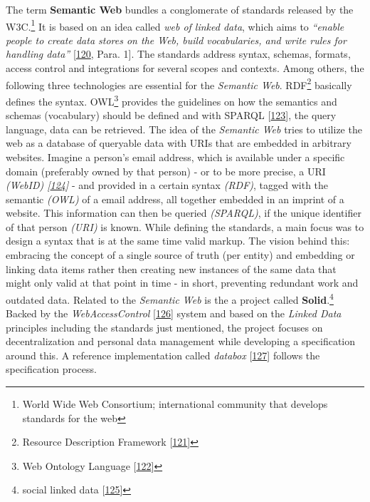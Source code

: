 \documentclass[12pt,english,a4paper,titlepage,cleardoublepage=empty,dottedtoc]{report}
\begin{document}
The term \textbf{\protect\hypertarget{def--semantic-web}{}{Semantic
Web}} bundles a conglomerate of standards released by the W3C.\footnote{World
  Wide Web Consortium; international community that develops standards
  for the web} It is based on an idea called \emph{web of linked data},
which aims to \emph{``enable people to create data stores on the Web,
build vocabularies, and write rules for handling data''}
{[}\protect\hyperlink{ref-web_2016_w3c_semantic-web-activity}{120},
Para. 1{]}. The standards address syntax, schemas, formats, access
control and integrations for several scopes and contexts. Among others,
the following three technologies are essential for the \emph{Semantic
Web}. RDF\footnote{Resource Description Framework
  {[}\protect\hyperlink{ref-web_w3c-tr_rdf}{121}{]}} basically defines
the syntax. OWL\footnote{Web Ontology Language
  {[}\protect\hyperlink{ref-web_w3c-tr_owl}{122}{]}} provides the
guidelines on how the semantics and schemas (vocabulary) should be
defined and with \protect\hypertarget{def--sparql}{}{SPARQL}
{[}\protect\hyperlink{ref-web_w3c-tr_sparql}{123}{]}, the query
language, data can be retrieved. The idea of the \emph{Semantic Web}
tries to utilize the web as a database of queryable data with URIs that
are embedded in arbitrary websites. Imagine a person's email address,
which is available under a specific domain (preferably owned by that
person) - or to be more precise, a URI \emph{(WebID)
{[}\protect\hyperlink{ref-web_w3c-draft_webid}{124}{]}} - and provided
in a certain syntax \emph{(RDF)}, tagged with the semantic \emph{(OWL)}
of a email address, all together embedded in an imprint of a website.
This information can then be queried \emph{(SPARQL)}, if the unique
identifier of that person \emph{(URI)} is known. While defining the
standards, a main focus was to design a syntax that is at the same time
valid markup. The vision behind this: embracing the concept of a single
source of truth (per entity) and embedding or linking data items rather
then creating new instances of the same data that might only valid at
that point in time - in short, preventing redundant work and outdated
data. Related to the \emph{Semantic Web} is the a project called
\textbf{Solid}.\footnote{social linked data
  {[}\protect\hyperlink{ref-web_spec_solid}{125}{]}} Backed by the
\emph{WebAccessControl}
{[}\protect\hyperlink{ref-web_2016_wiki_webaccesscontrol}{126}{]} system
and based on the \emph{Linked Data} principles including the standards
just mentioned, the project focuses on decentralization and personal
data management while developing a specification around this. A
reference implementation called \emph{databox}
{[}\protect\hyperlink{ref-web_2016_demo_databox}{127}{]} follows the
specification process.
\end{document}
